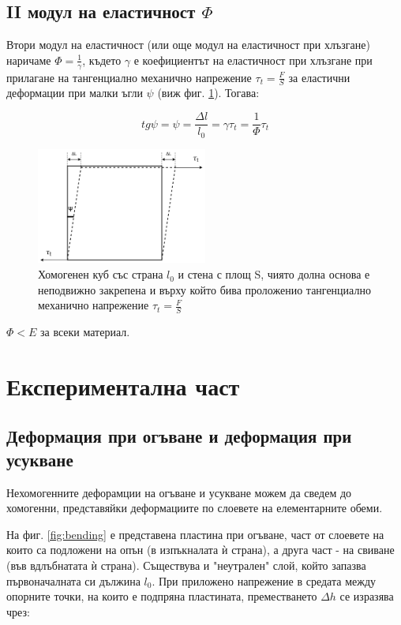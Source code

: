 \documentclass[12pt]{article}
\begin{document}
\subsection{II модул на еластичност $\Phi$}
Втори модул на еластичност (или още модул на еластичност при хлъзгане) наричаме $\Phi = \frac{1}{\gamma}$, където $\gamma$ е коефициентът на еластичност при хлъзгане при прилагане на тангенциално механично напрежение $\tau_t = \frac{F}{S}$ за еластични деформации при малки ъгли $\psi$ (виж фиг. \ref{fig:second-modulus-of-elasticity}). Тогава: 

\begin{equation}
    tg\psi = \psi = \frac{\Delta l}{l_0} = \gamma \tau_t = \frac{1}{\Phi} \tau_t
\end{equation}

\begin{figure}
    \centering
    \includegraphics[width=0.5\textwidth]{images/yound-second-modulus.drawio.png}
    \caption{Хомогенен куб със страна $l_0$ и стена с площ S, чиято долна основа е неподвижно закрепена и върху който бива проложенио тангенциално механично напрежение $\tau_t = \frac{F}{S}$}
    \label{fig:second-modulus-of-elasticity}
\end{figure}

$\Phi < E$ за всеки материал.

\section{Експериментална част}
\subsection{Деформация при огъване и деформация при усукване}
Нехомогенните дефорамции на огъване и усукване можем да сведем до хомогенни, представяйки деформациите по слоевете на елементарните обеми.

На фиг. \ref{fig:bending} е представена пластина при огъване, част от слоевете на които са подложени на опън (в изпъкналата ѝ страна), а друга част - на свиване (във вдлъбнатата ѝ страна). Съществува и "неутрален" слой, който запазва първоначалната си дължина $l_0$. При приложено напрежение в средата между опорните точки, на които е подпряна пластината, преместването $\Delta h$ се изразява чрез:
\end{document}
